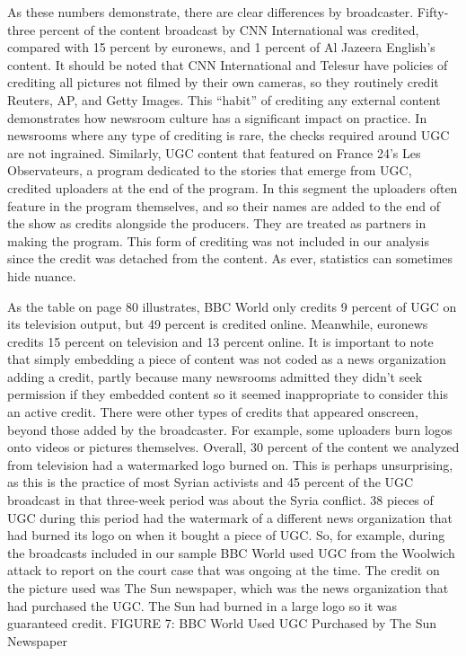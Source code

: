 \begin{enumerate}
As these numbers demonstrate, there are clear differences by broadcaster.
Fifty-three percent of the content broadcast by CNN International was
credited, compared with 15 percent by euronews, and 1 percent of Al
Jazeera English's content. It should be noted that CNN International and
Telesur have policies of crediting all pictures not filmed by their own cameras,
so they routinely credit Reuters, AP, and Getty Images. This ``habit'' of
crediting any external content demonstrates how newsroom culture has a
significant impact on practice. In newsrooms where any type of crediting is
rare, the checks required around UGC are not ingrained.
Similarly, UGC content that featured on France 24's Les Observateurs, a
program dedicated to the stories that emerge from UGC, credited uploaders
at the end of the program. In this segment the uploaders often feature
in the program themselves, and so their names are added to the end of the
show as credits alongside the producers. They are treated as partners in
making the program. This form of crediting was not included in our analysis
since the credit was detached from the content. As ever, statistics can
sometimes hide nuance.

As the table on page 80 illustrates, BBC World only credits 9 percent of
UGC on its television output, but 49 percent is credited online. Meanwhile,
euronews credits 15 percent on television and 13 percent online. It is
important to note that simply embedding a piece of content was not coded
as a news organization adding a credit, partly because many newsrooms
admitted they didn't seek permission if they embedded content so it seemed
inappropriate to consider this an active credit.
There were other types of credits that appeared onscreen, beyond those
added by the broadcaster. For example, some uploaders burn logos onto
videos or pictures themselves. Overall, 30 percent of the content we analyzed
from television had a watermarked logo burned on. This is perhaps
unsurprising, as this is the practice of most Syrian activists and 45 percent
of the UGC broadcast in that three-week period was about the Syria conflict.
38 pieces of UGC during this period had the watermark of a different
news organization that had burned its logo on when it bought a piece of
UGC. So, for example, during the broadcasts included in our sample BBC
World used UGC from the Woolwich attack to report on the court case that
was ongoing at the time. The credit on the picture used was The Sun newspaper,
which was the news organization that had purchased the UGC. The
Sun had burned in a large logo so it was guaranteed credit.
FIGURE 7: BBC World Used UGC Purchased by The Sun Newspaper


\end{enumerate}
